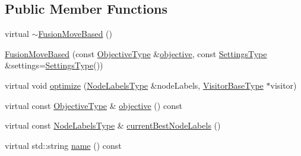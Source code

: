\subsection*{Public Member Functions}
\begin{DoxyCompactItemize}
\item 
virtual \hyperlink{classnifty_1_1graph_1_1optimization_1_1lifted__multicut_1_1FusionMoveBased_af02f771ad742d224f9d06dcddfaadbc4}{$\sim$\+Fusion\+Move\+Based} ()
\item 
\hyperlink{classnifty_1_1graph_1_1optimization_1_1lifted__multicut_1_1FusionMoveBased_ae31d0bedb2cd4d11fed5f2bda45473e2}{Fusion\+Move\+Based} (const \hyperlink{classnifty_1_1graph_1_1optimization_1_1lifted__multicut_1_1FusionMoveBased_ae74c42b0c469bda3b83c183d0909de12}{Objective\+Type} \&\hyperlink{classnifty_1_1graph_1_1optimization_1_1lifted__multicut_1_1FusionMoveBased_aa2636ea1d650e627a637b6b8e9753659}{objective}, const \hyperlink{structnifty_1_1graph_1_1optimization_1_1lifted__multicut_1_1FusionMoveBased_1_1SettingsType}{Settings\+Type} \&settings=\hyperlink{structnifty_1_1graph_1_1optimization_1_1lifted__multicut_1_1FusionMoveBased_1_1SettingsType}{Settings\+Type}())
\item 
virtual void \hyperlink{classnifty_1_1graph_1_1optimization_1_1lifted__multicut_1_1FusionMoveBased_aef5a2997aedcb771902732d5e85e0728}{optimize} (\hyperlink{classnifty_1_1graph_1_1optimization_1_1lifted__multicut_1_1FusionMoveBased_a6b7b611ab56b831717bd43c1feda92d6}{Node\+Labels\+Type} \&node\+Labels, \hyperlink{classnifty_1_1graph_1_1optimization_1_1lifted__multicut_1_1FusionMoveBased_ab99f9c64149f5748cb98d37b97e1eb4e}{Visitor\+Base\+Type} $\ast$visitor)
\item 
virtual const \hyperlink{classnifty_1_1graph_1_1optimization_1_1lifted__multicut_1_1FusionMoveBased_ae74c42b0c469bda3b83c183d0909de12}{Objective\+Type} \& \hyperlink{classnifty_1_1graph_1_1optimization_1_1lifted__multicut_1_1FusionMoveBased_aa2636ea1d650e627a637b6b8e9753659}{objective} () const 
\item 
virtual const \hyperlink{classnifty_1_1graph_1_1optimization_1_1lifted__multicut_1_1FusionMoveBased_a6b7b611ab56b831717bd43c1feda92d6}{Node\+Labels\+Type} \& \hyperlink{classnifty_1_1graph_1_1optimization_1_1lifted__multicut_1_1FusionMoveBased_af9d76f21526c383cf8cd9e41c184e615}{current\+Best\+Node\+Labels} ()
\item 
virtual std\+::string \hyperlink{classnifty_1_1graph_1_1optimization_1_1lifted__multicut_1_1FusionMoveBased_adeeb420508b179506547caaa35b67c04}{name} () const 
\end{DoxyCompactItemize}


